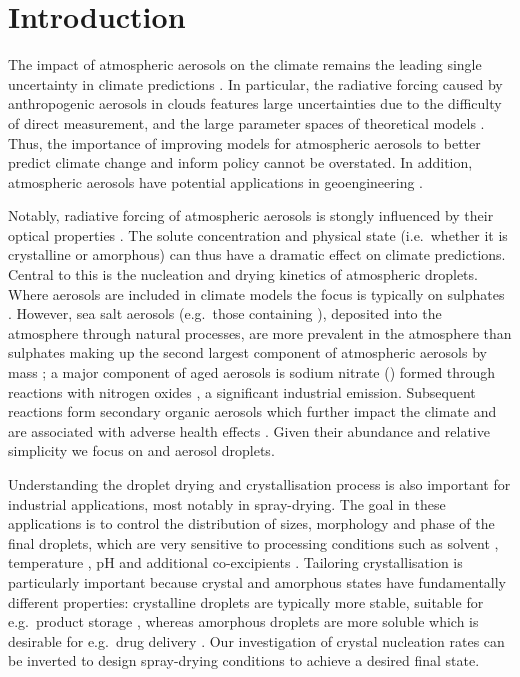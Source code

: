 \documentclass[11pt,twoside]{report}
\begin{document}
\section{Introduction}

The impact of atmospheric aerosols on the climate remains the leading single uncertainty in climate predictions \cite{BoucherIPCC2013,CarslawN2013,LeePNAS2016,RegayreACP2018}.
In particular, the radiative forcing caused by anthropogenic aerosols in clouds features large uncertainties due to the difficulty of direct measurement, and the large parameter spaces of theoretical models \cite{LeePNAS2016}.
Thus, the importance of improving models for atmospheric aerosols to better predict climate change and inform policy cannot be overstated.
In addition, atmospheric aerosols have potential applications in geoengineering \cite{PringleACP2012}.

Notably, radiative forcing of atmospheric aerosols is stongly influenced by their optical properties \cite{HodasACP2015,CotterellACP2017}.
The solute concentration and physical state (i.e.\ whether it is crystalline or amorphous) can thus have a dramatic effect on climate predictions.
Central to this is the nucleation and drying kinetics of atmospheric droplets.
Where aerosols are included in climate models the focus is typically on sulphates \cite{MannACP2014,ZhuNC2019}.
However, sea salt aerosols (e.g.\ those containing ), deposited into the atmosphere through natural processes, are more prevalent in the atmosphere than sulphates making up the second largest component of atmospheric aerosols by mass \cite{KeeneJAS1998}; a major component of aged  aerosols is sodium nitrate () formed through reactions with nitrogen oxides \cite{TolockaJPCA2004}, a significant industrial emission.
Subsequent reactions form secondary organic aerosols which further impact the climate \cite{ScottACP2014,PoschlCR2015} and are associated with adverse health effects \cite{PoschlCR2015}.
Given their abundance and relative simplicity we focus on  and  aerosol droplets.

Understanding the droplet drying and crystallisation process is also important for industrial applications, most notably in spray-drying.
The goal in these applications is to control the distribution of sizes, morphology and phase of the final droplets, which are very sensitive to processing conditions such as solvent \cite{CarverIECR2012,LintingreSM2016}, temperature \cite{IveyAST2018,YouDT2014,LinPT2015}, pH \cite{YuJPS2002,DubbiniIJP2014} and additional co-excipients \cite{ZhongAP2018,NandiyantoAPT2011,LyuJCG2017}.
Tailoring crystallisation is particularly important because crystal and amorphous states have fundamentally different properties: crystalline droplets are typically more stable, suitable for e.g.\ product storage \cite{VehringJAS2007,CostantinoJPS1998}, whereas amorphous droplets are more soluble which is desirable for e.g.\ drug delivery \cite{AmstadJPCB2016,BroughIJP2013}.
Our investigation of crystal nucleation rates can be inverted to design spray-drying conditions to achieve a desired final state.
\end{document}
